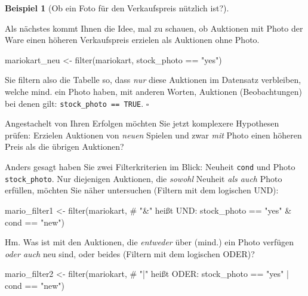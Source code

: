 \documentclass[
  letterpaper,
  twoside,
  open=any]{scrbook}
\newenvironment{Shaded}{\begin{snugshade}}{\end{snugshade}}
\newcommand{\CommentTok}[1]{\textcolor[rgb]{0.37,0.37,0.37}{#1}}
\newcommand{\FunctionTok}[1]{\textcolor[rgb]{0.28,0.35,0.67}{#1}}
\newcommand{\NormalTok}[1]{\textcolor[rgb]{0.00,0.23,0.31}{#1}}
\newcommand{\OtherTok}[1]{\textcolor[rgb]{0.00,0.23,0.31}{#1}}
\newcommand{\SpecialCharTok}[1]{\textcolor[rgb]{0.37,0.37,0.37}{#1}}
\newcommand{\StringTok}[1]{\textcolor[rgb]{0.13,0.47,0.30}{#1}}
\theoremstyle{definition}
\theoremstyle{definition}
\theoremstyle{definition}
\newtheorem{example}{Beispiel}[chapter]
\theoremstyle{remark}
\begin{document}
\begin{example}[Ob ein Foto für den Verkaufspreis nützlich
ist?]\protect\hypertarget{exm-filter}{}\label{exm-filter}

Als nächstes kommt Ihnen die Idee, mal zu schauen, ob Auktionen mit
Photo der Ware einen höheren Verkaufspreis erzielen als Auktionen ohne
Photo.

\begin{Shaded}
\begin{Highlighting}[]
\NormalTok{mariokart\_neu }\OtherTok{\textless{}{-}} \FunctionTok{filter}\NormalTok{(mariokart, stock\_photo }\SpecialCharTok{==} \StringTok{"yes"}\NormalTok{)}
\end{Highlighting}
\end{Shaded}

Sie filtern also die Tabelle so, dass \emph{nur} diese Auktionen im
Datensatz verbleiben, welche mind. ein Photo haben, mit anderen Worten,
Auktionen (Beobachtungen) bei denen gilt:
\texttt{stock\_photo\ ==\ TRUE}. \(\square\)

\end{example}

Angestachelt von Ihren Erfolgen möchten Sie jetzt komplexere Hypothesen
prüfen: Erzielen Auktionen von \emph{neuen} Spielen und zwar \emph{mit}
Photo einen höheren Preis als die übrigen Auktionen?

Anders gesagt haben Sie zwei Filterkriterien im Blick: Neuheit
\texttt{cond} und Photo \texttt{stock\_photo}. Nur diejenigen Auktionen,
die \emph{sowohl} Neuheit \emph{als auch} Photo erfüllen, möchten Sie
näher untersuchen (Filtern mit dem logischen UND):

\begin{Shaded}
\begin{Highlighting}[]
\NormalTok{mario\_filter1 }\OtherTok{\textless{}{-}} 
  \FunctionTok{filter}\NormalTok{(mariokart,  }\CommentTok{\# "\&" heißt UND:}
\NormalTok{         stock\_photo }\SpecialCharTok{==} \StringTok{"yes"} \SpecialCharTok{\&}\NormalTok{ cond }\SpecialCharTok{==} \StringTok{"new"}\NormalTok{)}
\end{Highlighting}
\end{Shaded}

Hm. Was ist mit den Auktionen, die \emph{entweder} über (mind.) ein
Photo verfügen \emph{oder auch} neu sind, oder beides (Filtern mit dem
logischen ODER)?

\begin{Shaded}
\begin{Highlighting}[]
\NormalTok{mario\_filter2 }\OtherTok{\textless{}{-}} 
  \FunctionTok{filter}\NormalTok{(mariokart,  }\CommentTok{\# "|" heißt ODER:}
\NormalTok{         stock\_photo }\SpecialCharTok{==} \StringTok{"yes"} \SpecialCharTok{|}\NormalTok{ cond }\SpecialCharTok{==} \StringTok{"new"}\NormalTok{)}
\end{Highlighting}
\end{Shaded}
\end{document}
